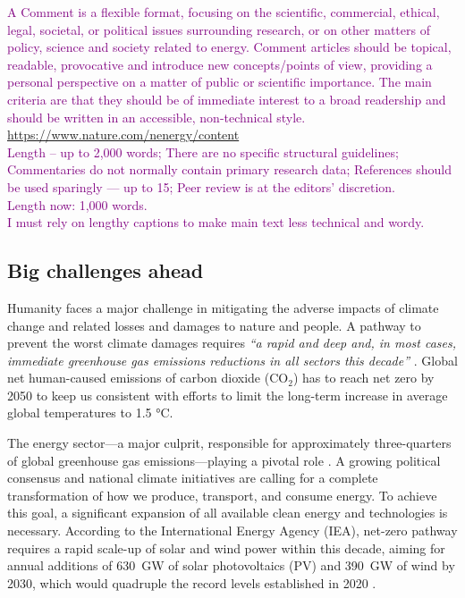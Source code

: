 \documentclass[pdflatex,sn-basic, Numbered]{sn-jnl}%
\theoremstyle{thmstyleone}%
\theoremstyle{thmstyletwo}%
\theoremstyle{thmstylethree}%
\newcommand{\comment}[1]{\textcolor{purple}{#1}}
\begin{document}
\comment{
A Comment is a flexible format, focusing on the scientific, commercial, ethical, legal, societal, or political issues surrounding research, or on other matters of policy, science and society related to energy. Comment articles should be topical, readable, provocative and introduce new concepts/points of view, providing a personal perspective on a matter of public or scientific importance. The main criteria are that they should be of immediate interest to a broad readership and should be written in an accessible, non-technical style. \href{https://www.nature.com/nenergy/content}{https://www.nature.com/nenergy/content}\\}
\comment{
\noindent Length -- up to 2,000 words; There are no specific structural guidelines; Commentaries do not normally contain primary research data; References should be used sparingly --- up to 15; Peer review is at the editors' discretion.\\
Length now: 1,000 words. \\ 
I must rely on lengthy captions to make main text less technical and wordy.
}


\subsection*{Big challenges ahead}\label{sec1}

Humanity faces a major challenge in mitigating the adverse impacts of climate change and related losses and damages to nature and people. A pathway to prevent the worst climate damages requires \textit{\enquote{a rapid and deep and, in most cases, immediate greenhouse gas emissions reductions in all sectors this decade}} \cite{ipccAR6SynthesisReport2023}. Global net human-caused emissions of carbon dioxide (CO$_2$) has to reach net zero by 2050 to keep us consistent with efforts to limit the long-term increase in average global temperatures to 1.5 °C.

The energy sector—a major culprit, responsible for approximately three-quarters of global greenhouse gas emissions—playing a pivotal role \cite{ieaNetZero20502021}. A growing political consensus and national climate initiatives are calling for a complete transformation of how we produce, transport, and consume energy. To achieve this goal, a significant expansion of all available  clean energy and technologies is necessary. According to the International Energy Agency (IEA), net-zero pathway requires a rapid scale-up of solar and wind power within this decade, aiming for annual additions of 630~GW of solar photovoltaics (PV) and 390~GW of wind by 2030, which would quadruple the record levels established in 2020 \cite{ieaNetZero20502021}.
\end{document}
